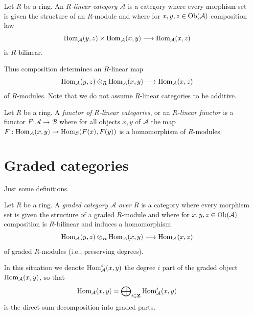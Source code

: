 \begin{definition}
\label{definition-linear-category}
Let $R$ be a ring. An {\it $R$-linear category $\mathcal{A}$} is a category
where every morphism set is given the structure of an $R$-module
and where for $x, y, z \in \mathop{\mathrm{Ob}}\nolimits(\mathcal{A})$ composition law
$$
\mathop{\mathrm{Hom}}\nolimits_\mathcal{A}(y, z) \times \mathop{\mathrm{Hom}}\nolimits_\mathcal{A}(x, y)
\longrightarrow
\mathop{\mathrm{Hom}}\nolimits_\mathcal{A}(x, z)
$$
is $R$-bilinear.
\end{definition}

\noindent
Thus composition determines an $R$-linear map
$$
\mathop{\mathrm{Hom}}\nolimits_\mathcal{A}(y, z) \otimes_R \mathop{\mathrm{Hom}}\nolimits_\mathcal{A}(x, y)
\longrightarrow
\mathop{\mathrm{Hom}}\nolimits_\mathcal{A}(x, z)
$$
of $R$-modules. Note that we do not assume $R$-linear categories to be
additive.

\begin{definition}
\label{definition-functor-linear-categories}
Let $R$ be a ring. A {\it functor of $R$-linear categories}, or an
{\it $R$-linear functor} is a functor $F : \mathcal{A} \to \mathcal{B}$
where for all objects $x, y$ of $\mathcal{A}$ the map
$F : \mathop{\mathrm{Hom}}\nolimits_\mathcal{A}(x, y) \to \mathop{\mathrm{Hom}}\nolimits_\mathcal{B}(F(x), F(y))$
is a homomorphism of $R$-modules.
\end{definition}







\section{Graded categories}
\label{section-graded}

\noindent
Just some definitions.

\begin{definition}
\label{definition-graded-category}
Let $R$ be a ring. A {\it graded category $\mathcal{A}$
over $R$} is a category where every morphism set is given the structure
of a graded $R$-module and where for
$x, y, z \in \mathop{\mathrm{Ob}}\nolimits(\mathcal{A})$ composition is $R$-bilinear and induces
a homomorphism
$$
\mathop{\mathrm{Hom}}\nolimits_\mathcal{A}(y, z) \otimes_R \mathop{\mathrm{Hom}}\nolimits_\mathcal{A}(x, y)
\longrightarrow
\mathop{\mathrm{Hom}}\nolimits_\mathcal{A}(x, z)
$$
of graded $R$-modules (i.e., preserving degrees).
\end{definition}

\noindent
In this situation we denote $\mathop{\mathrm{Hom}}\nolimits_\mathcal{A}^i(x, y)$ the degree $i$
part of the graded object $\mathop{\mathrm{Hom}}\nolimits_\mathcal{A}(x, y)$, so that
$$
\mathop{\mathrm{Hom}}\nolimits_\mathcal{A}(x, y) =
\bigoplus\nolimits_{i \in \mathbf{Z}} \mathop{\mathrm{Hom}}\nolimits_\mathcal{A}^i(x, y)
$$
is the direct sum decomposition into graded parts.

